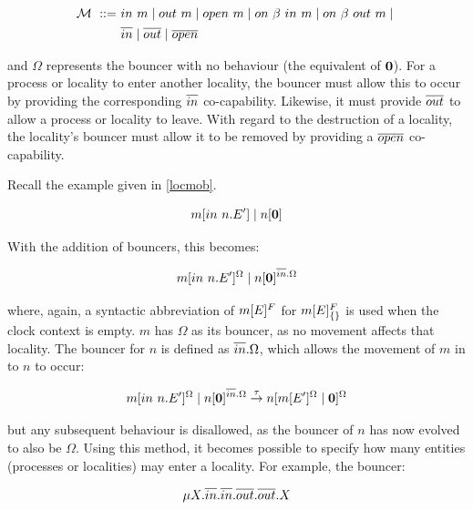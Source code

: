 \begin{equation}
  \begin{aligned}
    \text{$\mathcal{M}$}\ ::=\ & in\ m \;|\; out\ m \;|\; open\ m \;|\;
     on\ \beta\ in\ m \;|\;  
   on\ \beta\ out\ m \;|\; \\ & \overline{in} \;|\;
   \overline{out} \;|\; \overline{open}
   \end{aligned}
\end{equation}

\noindent and $\Omega$ represents the bouncer with no behaviour (the
equivalent of $\textbf{0}$).  For a process or locality to enter another
locality, the bouncer must allow this to occur by providing the
corresponding $\overline{in}$ co-capability.  Likewise, it must provide $\overline{out}$
to allow a process or locality to leave.  With regard to the destruction
of a locality, the locality's bouncer must allow it to be removed by
providing a $\overline{open}$ co-capability.

Recall the example given in \ref{locmob}.

\begin{equation}
{m}[ in\ n.E^\prime ]\;|\;{n}[ \textbf{0} ]
\end{equation}

\noindent With the addition of bouncers, this becomes:

\begin{equation}
{m}[ in\ n.E^\prime ]^{\Omega}\;|\;{n}[ \textbf{0} ]^{\overline{in}.\Omega}
\end{equation}

\noindent where, again, a syntactic abbreviation of ${m}[ E ]^{F}$ for
${m}[ E ]^{F}_{\{\}}$ is used when the clock context is empty. $m$ has
$\Omega$ as its bouncer, as no movement affects that locality.  The
bouncer for $n$ is defined as $\overline{in}.\Omega$, which allows the movement
of $m$ in to $n$ to occur:

\begin{equation}
{m}[ in\ n.E^\prime ]^{\Omega}\;|\;{n}[ \textbf{0} ]^{\overline{in}.\Omega}
 \stackrel{\tau}{\rightarrow}
{n}[ {m}[ E^\prime ]^{\Omega} \;|\; \textbf{0} ]^{\Omega}
\end{equation}

\noindent but any subsequent behaviour is disallowed, as the bouncer of
$n$ has now evolved to also be $\Omega$.  Using this method, it becomes
possible to specify how many entities (processes or localities) may
enter a locality.  For example, the bouncer:

\begin{equation}
\mu X.\overline{in}.\overline{in}.\overline{out}.\overline{out}.X
\end{equation}


